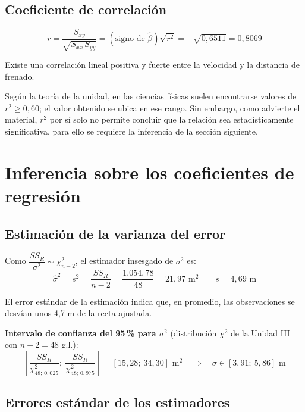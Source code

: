\documentclass[12pt,a4paper]{article}
\begin{document}
\subsection{Coeficiente de correlación}

\begin{equation}
r = \frac{S_{xy}}{\sqrt{S_{xx}\,S_{yy}}} = (\text{signo de } \hat{\beta})\sqrt{r^2} = +\sqrt{0{,}6511} = 0{,}8069
\end{equation}

Existe una correlación lineal positiva y fuerte entre la velocidad y la distancia de frenado.

Según la teoría de la unidad, en las ciencias físicas suelen encontrarse valores de $r^2 \geq 0{,}60$; el valor obtenido se ubica en ese rango. Sin embargo, como advierte el material, $r^2$ por sí solo no permite concluir que la relación sea estadísticamente significativa, para ello se requiere la inferencia de la sección siguiente.

\section{Inferencia sobre los coeficientes de regresión}

\subsection{Estimación de la varianza del error}

Como $\dfrac{SS_R}{\sigma^2} \sim \chi^2_{n-2}$, el estimador insesgado de $\sigma^2$ es:
\begin{equation}
\hat{\sigma}^2 = s^2 = \frac{SS_R}{n-2} = \frac{1.054{,}78}{48} = 21{,}97 \text{ m}^2 \qquad s = 4{,}69 \text{ m}
\end{equation}

El error estándar de la estimación indica que, en promedio, las observaciones se desvían unos 4{,}7 m de la recta ajustada.

\textbf{Intervalo de confianza del 95\,\% para $\sigma^2$} (distribución $\chi^2$ de la Unidad III con $n-2 = 48$ g.l.):
\begin{equation}
\left[\frac{SS_R}{\chi^2_{48;\,0{,}025}};\ \frac{SS_R}{\chi^2_{48;\,0{,}975}}\right] = [15{,}28;\ 34{,}30] \text{ m}^2 \quad\Rightarrow\quad \sigma \in [3{,}91;\ 5{,}86] \text{ m}
\end{equation}

\subsection{Errores estándar de los estimadores}
\end{document}
